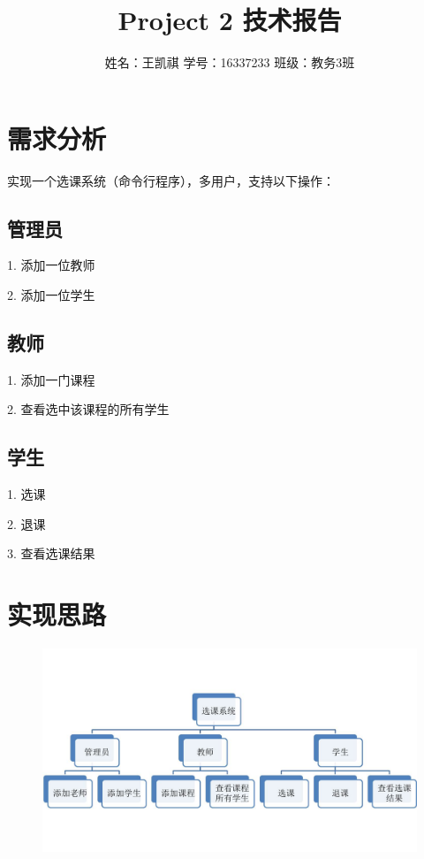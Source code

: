 \documentclass{article}
\begin{document}
\title{Project 2 技术报告}
\author {姓名：王凯祺 \text{ } 学号：16337233 \text{ } 班级：教务3班}
\maketitle

\section{需求分析}
实现一个选课系统（命令行程序），多用户，支持以下操作：

\subsection{管理员}

1. 添加一位教师

2. 添加一位学生

\subsection{教师}

1. 添加一门课程

2. 查看选中该课程的所有学生

\subsection{学生}

1. 选课

2. 退课

3. 查看选课结果

\section{实现思路}

\begin{figure}[!hbp]
	\centering
	\includegraphics[scale=0.45]{S1.jpg}
\end{figure}
\end{document}
